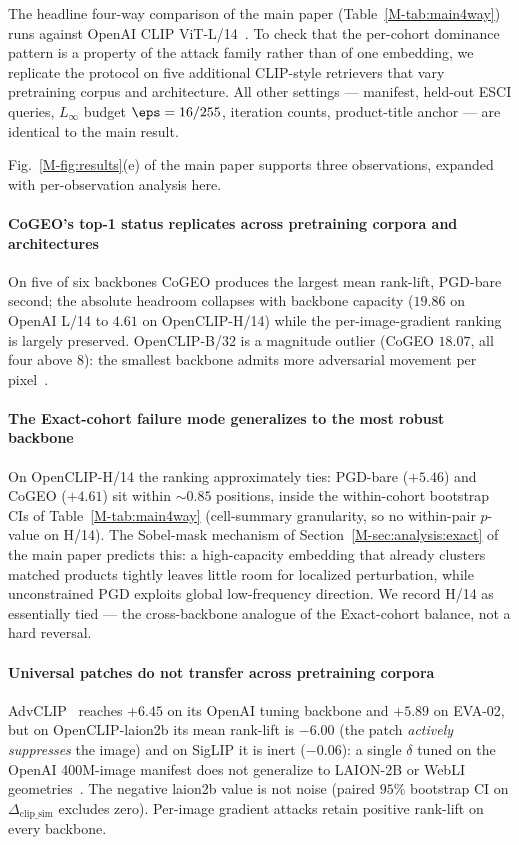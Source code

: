 The headline four-way comparison of the main paper (Table~\ref{M-tab:main4way}) runs against OpenAI CLIP ViT-L/14~\cite{radford2021clip}. To check that the per-cohort dominance pattern is a property of the attack family rather than of one embedding, we replicate the protocol on five additional CLIP-style retrievers that vary pretraining corpus and architecture. All other settings --- manifest, held-out ESCI queries, $L_\infty$ budget $\eps = 16/255$, iteration counts, product-title anchor --- are identical to the main result.

Fig.~\ref{M-fig:results}(e) of the main paper supports three observations, expanded with per-observation analysis here.

\paragraph{CoGEO's top-1 status replicates across pretraining corpora and architectures} On five of six backbones CoGEO produces the largest mean rank-lift, PGD-bare second; the absolute headroom collapses with backbone capacity ($19.86$ on OpenAI L/14 to $4.61$ on OpenCLIP-H/14) while the per-image-gradient ranking is largely preserved. OpenCLIP-B/32 is a magnitude outlier (CoGEO $18.07$, all four above $8$): the smallest backbone admits more adversarial movement per pixel~\cite{schlarmann2024robustclip}.

\paragraph{The Exact-cohort failure mode generalizes to the most robust backbone} On OpenCLIP-H/14 the ranking approximately ties: PGD-bare ($+5.46$) and CoGEO ($+4.61$) sit within $\mathord{\sim}0.85$ positions, inside the within-cohort bootstrap CIs of Table~\ref{M-tab:main4way} (cell-summary granularity, so no within-pair $p$-value on H/14). The Sobel-mask mechanism of Section~\ref{M-sec:analysis:exact} of the main paper predicts this: a high-capacity embedding that already clusters matched products tightly leaves little room for localized perturbation, while unconstrained PGD exploits global low-frequency direction. We record H/14 as essentially tied --- the cross-backbone analogue of the Exact-cohort balance, not a hard reversal.

\paragraph{Universal patches do not transfer across pretraining corpora} AdvCLIP~\cite{zhou2023advclip} reaches $+6.45$ on its OpenAI tuning backbone and $+5.89$ on EVA-02, but on OpenCLIP-laion2b its mean rank-lift is $-6.00$ (the patch \emph{actively suppresses} the image) and on SigLIP it is inert ($-0.06$): a single $\delta$ tuned on the OpenAI 400M-image manifest does not generalize to LAION-2B or WebLI geometries~\cite{moosavidezfooli2017uap,thys2019adversarialpatches}. The negative laion2b value is not noise (paired $95\%$ bootstrap CI on $\Delta_{\mathrm{clip\_sim}}$ excludes zero). Per-image gradient attacks retain positive rank-lift on every backbone.

